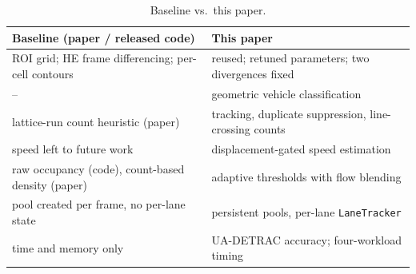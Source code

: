 \documentclass[conference]{IEEEtran}
\newcommand{\code}[1]{\texttt{#1}}
\begin{document}
\begin{table}[t]
\centering
\caption{Baseline \cite{baseline} vs.\ this paper.}
\label{tab:baseline}
\scriptsize
\setlength{\tabcolsep}{3pt}
\begin{tabular}{p{3.85cm}p{4.2cm}}
\toprule
\textbf{Baseline (paper / released code)} & \textbf{This paper} \\
\midrule
ROI grid; HE frame differencing; per-cell contours & reused; retuned parameters; two divergences fixed \\
-- & geometric vehicle classification \\
lattice-run count heuristic (paper) & tracking, duplicate suppression, line-crossing counts \\
speed left to future work & displacement-gated speed estimation \\
raw occupancy (code), count-based density (paper) & adaptive thresholds with flow blending \\
pool created per frame, no per-lane state & persistent pools, per-lane \code{LaneTracker} \\
time and memory only & UA-DETRAC accuracy; four-workload timing \\
\bottomrule
\end{tabular}
\end{table}
\end{document}
